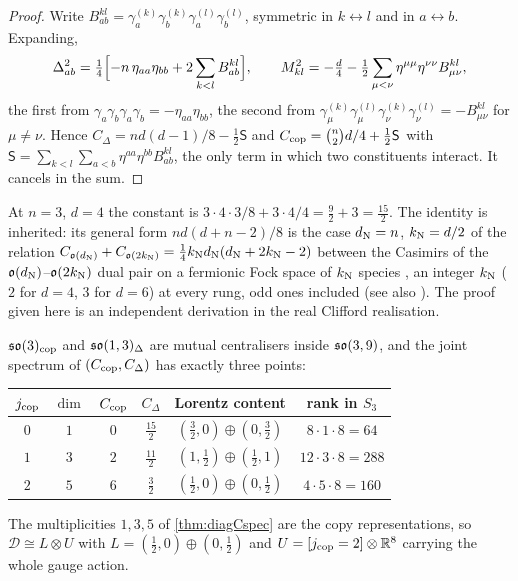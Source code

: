 \begin{proof}
Write $B^{kl}_{ab}=\gamma^{(k)}_a\gamma^{(k)}_b\gamma^{(l)}_a\gamma^{(l)}_b$, symmetric in $k\leftrightarrow l$ and in $a\leftrightarrow b$. Expanding,
\[
\Delta_{ab}^2=\tfrac14\Bigl[-n\,\eta_{aa}\eta_{bb}+2\sum_{k<l}B^{kl}_{ab}\Bigr],\qquad
M_{kl}^2=-\tfrac d4-\tfrac12\sum_{\mu<\nu}\eta^{\mu\mu}\eta^{\nu\nu}B^{kl}_{\mu\nu},
\]
the first from $\gamma_a\gamma_b\gamma_a\gamma_b=-\eta_{aa}\eta_{bb}$, the second from
$\gamma^{(k)}_\mu\gamma^{(l)}_\mu\gamma^{(k)}_\nu\gamma^{(l)}_\nu=-B^{kl}_{\mu\nu}$ for $\mu\neq\nu$. Hence $C_\Delta=nd(d-1)/8-\tfrac12\mathsf S$ and
$C_{\rm cop}=\binom n2d/4+\tfrac12\mathsf S$ with $\mathsf S=\sum_{k<l}\sum_{a<b}\eta^{aa}\eta^{bb}B^{kl}_{ab}$, the only term in which two
constituents interact. It cancels in the sum.
\end{proof}

At $n=3$, $d=4$ the constant is $3\cdot4\cdot3/8+3\cdot4/4=\tfrac92+3=\tfrac{15}2$. The identity is inherited: its general form $nd(d+n-2)/8$ is the
case $d_{\rm N}=n$, $k_{\rm N}=d/2$ of the relation $C_{\mathfrak o(d_{\rm N})}+C_{\mathfrak o(2k_{\rm N})}=\tfrac14k_{\rm N}d_{\rm N}(d_{\rm N}+2k_{\rm N}-2)$ between the
Casimirs of the $\mathfrak o(d_{\rm N})$--$\mathfrak o(2k_{\rm N})$ dual pair on a fermionic Fock space of $k_{\rm N}$ species \cite[eq.~(73)]{Neergard19}, an
integer $k_{\rm N}$ ($2$ for $d=4$, $3$ for $d=6$) at every rung, odd ones included (see also \cite{Neergard20,Howe89}). The proof given here is an independent derivation in the
real Clifford realisation.

\begin{corollary}
\label{cor:howe}
$\mathfrak{so}(3)_{\rm cop}$ and $\mathfrak{so}(1,3)_\Delta$ are mutual centralisers inside $\mathfrak{so}(3,9)$, and the joint spectrum of $(C_{\rm cop},C_\Delta)$ has exactly
three points:
\begin{center}
\begin{tabular}{@{}cccccc@{}}
\toprule
$j_{\rm cop}$ & $\dim$ & $C_{\rm cop}$ & $C_\Delta$ & Lorentz content & rank in $S_3$\\
\midrule
$0$ & $1$ & $0$ & $\tfrac{15}2$ & $(\tfrac32,0)\oplus(0,\tfrac32)$ & $8\cdot1\cdot8=64$\\
$1$ & $3$ & $2$ & $\tfrac{11}2$ & $(1,\tfrac12)\oplus(\tfrac12,1)$ & $12\cdot3\cdot8=288$\\
$2$ & $5$ & $6$ & $\tfrac32$ & $(\tfrac12,0)\oplus(0,\tfrac12)$ & $4\cdot5\cdot8=160$\\
\bottomrule
\end{tabular}
\end{center}
The multiplicities $1,3,5$ of \cref{thm:diagCspec} are the copy representations, so $\mathcal D\cong L\otimes U$ with
$L=(\tfrac12,0)\oplus(0,\tfrac12)$ and $U=[j_{\rm cop}=2]\otimes\mathbb{R}^8$ carrying the whole gauge action.
\end{corollary}


